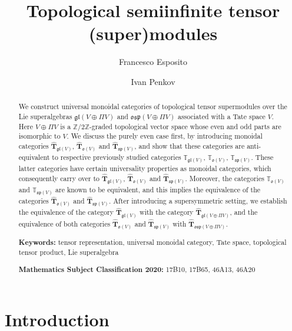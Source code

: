 \documentclass[12pt,reqno]{amsart}
\title{Topological semiinfinite tensor (super)modules}
\author[Esposito]{Francesco Esposito}
\author[I. Penkov]{Ivan Penkov}
\theoremstyle{definition}
\theoremstyle{remark}
\begin{document}
	
	\maketitle
	
	\begin{abstract}
		We construct universal monoidal categories of topological tensor supermodules over the Lie superalgebras $\mathfrak{gl}(V\oplus \Pi V)$ and $\mathfrak{osp}(V\oplus \Pi V)$ associated with a Tate space $V$.
        Here $V\oplus \Pi V$ is a $\mathbb{Z}/2\mathbb{Z}$-graded topological vector space whose even and odd parts are isomorphic to $V$.
        We discuss the purely even case first, by introducing monoidal categories 
        $\widehat{\mathbf{T}}_{\mathfrak{gl}(V)}$, $\widehat{\mathbf{T}}_{\mathfrak{o}(V)}$ and 
        $\widehat{\mathbf{T}}_{\mathfrak{sp}(V)}$, 
        and show that these categories are anti-equivalent to respective previously studied categories
	$\mathbb{T}_{\mathfrak{gl}(V)}$, $\mathbb{T}_{\mathfrak{o}(V)}$, $\mathbb{T}_{\mathfrak{sp}(V)}$. 
        These latter categories have certain universality properties as monoidal categories, which consequently carry over to
        $\widehat{\mathbf{T}}_{\mathfrak{gl}(V)}$, $\widehat{\mathbf{T}}_{\mathfrak{o}(V)}$ and 
        $\widehat{\mathbf{T}}_{\mathfrak{sp}(V)}$. Moreover,
        the categories $\mathbb{T}_{\mathfrak{o}(V)}$ and $\mathbb{T}_{\mathfrak{sp}(V)}$ are known to be equivalent, and this implies the equivalence of the categories 
        $\widehat{\mathbf{T}}_{\mathfrak{o}(V)}$ and 
        $\widehat{\mathbf{T}}_{\mathfrak{sp}(V)}$.
        After introducing a supersymmetric setting, we establish the equivalence of the category 
        $\widehat{\mathbf{T}}_{\mathfrak{gl}(V)}$ with the category 
        $\widehat{\mathbf{T}}_{\mathfrak{gl}(V\oplus \Pi V)}$, and the equivalence of both categories $\widehat{\mathbf{T}}_{\mathfrak{o}(V)}$ and 
        $\widehat{\mathbf{T}}_{\mathfrak{sp}(V)}$ with 
        $\widehat{\mathbf{T}}_{\mathfrak{osp}(V\oplus \Pi V)}$.
		
		\textbf{Keywords:} tensor representation, universal monoidal category, Tate space, topological tensor product, Lie superalgebra
		
		\textbf{Mathematics Subject Classification 2020:} 17B10, 17B65, 46A13, 46A20
	\end{abstract}
	
	\section{Introduction}
\end{document}
